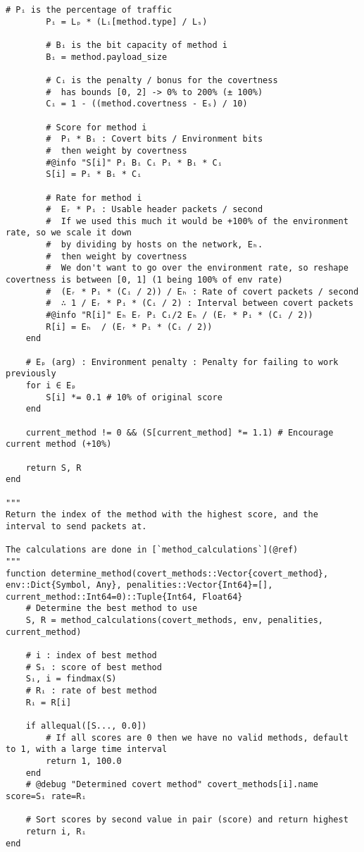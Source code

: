 \begin{lstlisting}[language=JuliaLocal, style=julia]
        # Pᵢ is the percentage of traffic 
        Pᵢ = Lₚ * (Lᵢ[method.type] / Lₛ)

        # Bᵢ is the bit capacity of method i
        Bᵢ = method.payload_size

        # Cᵢ is the penalty / bonus for the covertness
        #  has bounds [0, 2] -> 0% to 200% (± 100%)
        Cᵢ = 1 - ((method.covertness - Eₛ) / 10)

        # Score for method i
        #  Pᵢ * Bᵢ : Covert bits / Environment bits
        #  then weight by covertness
        #@info "S[i]" Pᵢ Bᵢ Cᵢ Pᵢ * Bᵢ * Cᵢ
        S[i] = Pᵢ * Bᵢ * Cᵢ

        # Rate for method i
        #  Eᵣ * Pᵢ : Usable header packets / second
        #  If we used this much it would be +100% of the environment rate, so we scale it down
        #  by dividing by hosts on the network, Eₕ.
        #  then weight by covertness
        #  We don't want to go over the environment rate, so reshape covertness is between [0, 1] (1 being 100% of env rate)
        #  (Eᵣ * Pᵢ * (Cᵢ / 2)) / Eₕ : Rate of covert packets / second
        #  ∴ 1 / Eᵣ * Pᵢ * (Cᵢ / 2) : Interval between covert packets
        #@info "R[i]" Eₕ Eᵣ Pᵢ Cᵢ/2 Eₕ / (Eᵣ * Pᵢ * (Cᵢ / 2))
        R[i] = Eₕ  / (Eᵣ * Pᵢ * (Cᵢ / 2)) 
    end

    # Eₚ (arg) : Environment penalty : Penalty for failing to work previously
    for i ∈ Eₚ
        S[i] *= 0.1 # 10% of original score
    end

    current_method != 0 && (S[current_method] *= 1.1) # Encourage current method (+10%)

    return S, R
end

"""
Return the index of the method with the highest score, and the interval to send packets at.

The calculations are done in [`method_calculations`](@ref)
"""
function determine_method(covert_methods::Vector{covert_method}, env::Dict{Symbol, Any}, penalities::Vector{Int64}=[], current_method::Int64=0)::Tuple{Int64, Float64}
    # Determine the best method to use
    S, R = method_calculations(covert_methods, env, penalities, current_method)

    # i : index of best method
    # Sᵢ : score of best method
    Sᵢ, i = findmax(S)
    # Rᵢ : rate of best method
    Rᵢ = R[i]

    if allequal([S..., 0.0])
        # If all scores are 0 then we have no valid methods, default to 1, with a large time interval
        return 1, 100.0
    end
    # @debug "Determined covert method" covert_methods[i].name score=Sᵢ rate=Rᵢ

    # Sort scores by second value in pair (score) and return highest
    return i, Rᵢ
end

\end{lstlisting}
